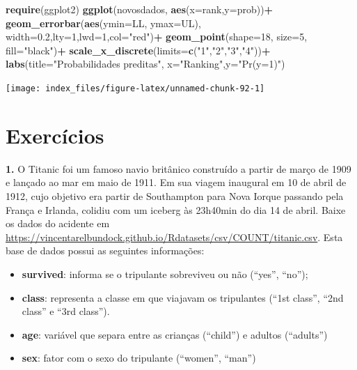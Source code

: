 \documentclass[12pt,brazil,oneside]{book}
\newenvironment{Shaded}{\begin{snugshade}}{\end{snugshade}}
\newcommand{\DataTypeTok}[1]{\textcolor[rgb]{0.13,0.29,0.53}{#1}}
\newcommand{\DecValTok}[1]{\textcolor[rgb]{0.00,0.00,0.81}{#1}}
\newcommand{\FloatTok}[1]{\textcolor[rgb]{0.00,0.00,0.81}{#1}}
\newcommand{\KeywordTok}[1]{\textcolor[rgb]{0.13,0.29,0.53}{\textbf{#1}}}
\newcommand{\NormalTok}[1]{#1}
\newcommand{\OperatorTok}[1]{\textcolor[rgb]{0.81,0.36,0.00}{\textbf{#1}}}
\newcommand{\StringTok}[1]{\textcolor[rgb]{0.31,0.60,0.02}{#1}}
\providecommand{\tightlist}{%
  \setlength{\itemsep}{0pt}\setlength{\parskip}{0pt}}
\begin{document}
\begin{Shaded}
\begin{Highlighting}[]
\KeywordTok{require}\NormalTok{(ggplot2)}
\KeywordTok{ggplot}\NormalTok{(novosdados, }\KeywordTok{aes}\NormalTok{(}\DataTypeTok{x=}\NormalTok{rank,}\DataTypeTok{y=}\NormalTok{prob))}\OperatorTok{+}
\StringTok{  }\KeywordTok{geom_errorbar}\NormalTok{(}\KeywordTok{aes}\NormalTok{(}\DataTypeTok{ymin=}\NormalTok{LL, }\DataTypeTok{ymax=}\NormalTok{UL), }\DataTypeTok{width=}\FloatTok{0.2}\NormalTok{,}\DataTypeTok{lty=}\DecValTok{1}\NormalTok{,}\DataTypeTok{lwd=}\DecValTok{1}\NormalTok{,}\DataTypeTok{col=}\StringTok{"red"}\NormalTok{)}\OperatorTok{+}
\StringTok{  }\KeywordTok{geom_point}\NormalTok{(}\DataTypeTok{shape=}\DecValTok{18}\NormalTok{, }\DataTypeTok{size=}\DecValTok{5}\NormalTok{, }\DataTypeTok{fill=}\StringTok{"black"}\NormalTok{)}\OperatorTok{+}
\StringTok{  }\KeywordTok{scale_x_discrete}\NormalTok{(}\DataTypeTok{limits=}\KeywordTok{c}\NormalTok{(}\StringTok{"1"}\NormalTok{,}\StringTok{"2"}\NormalTok{,}\StringTok{"3"}\NormalTok{,}\StringTok{"4"}\NormalTok{))}\OperatorTok{+}
\StringTok{  }\KeywordTok{labs}\NormalTok{(}\DataTypeTok{title=}\StringTok{"Probabilidades preditas"}\NormalTok{, }\DataTypeTok{x=}\StringTok{"Ranking"}\NormalTok{,}\DataTypeTok{y=}\StringTok{"Pr(y=1)"}\NormalTok{)}
\end{Highlighting}
\end{Shaded}

\begin{center}\texttt{[image: index\_files/figure-latex/unnamed-chunk-92-1]} \end{center}

\hypertarget{exercicios}{%
\section{Exercícios}\label{exercicios}}

\textbf{1.} O Titanic foi um famoso navio britânico construído a partir de março de 1909 e lançado ao mar em maio de 1911. Em sua viagem inaugural em 10 de abril de 1912, cujo objetivo era partir de Southampton para Nova Iorque passando pela França e Irlanda, colidiu com um iceberg às 23h40min do dia 14 de abril. Baixe os dados do acidente em
\url{https://vincentarelbundock.github.io/Rdatasets/csv/COUNT/titanic.csv}. Esta base de dados possui as seguintes informações:

\begin{itemize}
\tightlist
\item
  \textbf{survived}: informa se o tripulante sobreviveu ou não (``yes'', ``no'');
\item
  \textbf{class}: representa a classe em que viajavam os tripulantes (``1st class'', ``2nd class'' e ``3rd class'').
\item
  \textbf{age}: variável que separa entre as crianças (``child'') e adultos (``adults'')
\item
  \textbf{sex}: fator com o sexo do tripulante (``women'', ``man'')
\end{itemize}
\end{document}
